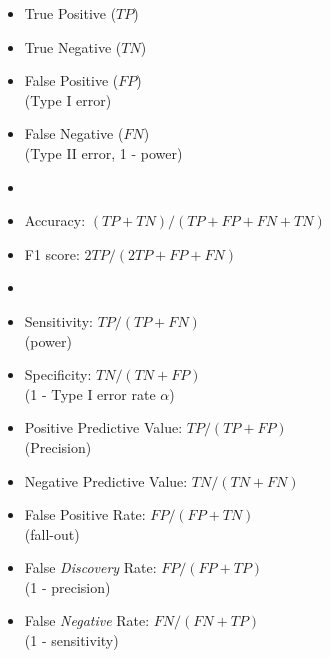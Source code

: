 \documentclass[11pt, oneside]{article}
\begin{document}
\noindent \begin{minipage}{0.55\linewidth} 

\begin{itemize}
\setlength\itemsep{0em}
\item True Positive ($TP$)
\item True Negative ($TN$)
\item False Positive ($FP$)\\ (Type I error)
\item False Negative ($FN$)\\ (Type II error, 1 - power)
\item[] 
\item Accuracy: $(TP+TN)/(TP+FP+FN+TN)$
\item F1 score: $2TP/(2TP+FP+FN)$
\item[] 
\item Sensitivity: $TP/(TP+FN)$\\ (power)
\item Specificity: $TN/(TN+FP)$\\ (1 - Type I error rate $\alpha$)
\item Positive Predictive Value: $TP/(TP+FP)$\\ (Precision)
\item Negative Predictive Value: $TN/(TN+FN)$\\ 
\item False Positive Rate: $FP/(FP+TN)$ \\(fall-out)
\item False \emph{Discovery} Rate: $FP/(FP+TP)$\\(1 - precision)
\item False \emph{Negative} Rate: $FN/(FN+TP)$\\(1 - sensitivity)
\end{itemize}
\end{minipage}
\end{document}
